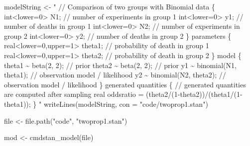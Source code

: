 \documentclass[
]{memoir}
\newenvironment{Shaded}{\begin{snugshade}}{\end{snugshade}}
\newcommand{\AttributeTok}[1]{\textcolor[rgb]{0.77,0.63,0.00}{#1}}
\newcommand{\DecValTok}[1]{\textcolor[rgb]{0.00,0.00,0.81}{#1}}
\newcommand{\FunctionTok}[1]{\textcolor[rgb]{0.00,0.00,0.00}{#1}}
\newcommand{\NormalTok}[1]{#1}
\newcommand{\OtherTok}[1]{\textcolor[rgb]{0.56,0.35,0.01}{#1}}
\newcommand{\SpecialCharTok}[1]{\textcolor[rgb]{0.00,0.00,0.00}{#1}}
\newcommand{\StringTok}[1]{\textcolor[rgb]{0.31,0.60,0.02}{#1}}
\begin{document}
\begin{Shaded}
\begin{Highlighting}[]
\NormalTok{modelString }\OtherTok{\textless{}{-}} \StringTok{"}
\StringTok{//  Comparison of two groups with Binomial}
\StringTok{data \{}
\StringTok{  int\textless{}lower=0\textgreater{} N1;              // number of experiments in group 1}
\StringTok{  int\textless{}lower=0\textgreater{} y1;              // number of deaths in group 1}
\StringTok{  int\textless{}lower=0\textgreater{} N2;              // number of experiments in group 2}
\StringTok{  int\textless{}lower=0\textgreater{} y2;              // number of deaths in group 2}
\StringTok{\}}
\StringTok{parameters \{}
\StringTok{  real\textless{}lower=0,upper=1\textgreater{} theta1; // probability of death in group 1}
\StringTok{  real\textless{}lower=0,upper=1\textgreater{} theta2; // probability of death in group 2}
\StringTok{\}}
\StringTok{model \{}
\StringTok{  theta1 \textasciitilde{} beta(2, 2);          // prior}
\StringTok{  theta2 \textasciitilde{} beta(2, 2);          // prior}
\StringTok{  y1 \textasciitilde{} binomial(N1, theta1);    // observation model / likelihood}
\StringTok{  y2 \textasciitilde{} binomial(N2, theta2);    // observation model / likelihood}
\StringTok{\}}
\StringTok{generated quantities \{}
\StringTok{  // generated quantities are computed after sampling}
\StringTok{  real oddsratio = (theta2/(1{-}theta2))/(theta1/(1{-}theta1));}
\StringTok{\}}
\StringTok{"}
\FunctionTok{writeLines}\NormalTok{(modelString, }\AttributeTok{con =} \StringTok{"code/twoprop1.stan"}\NormalTok{)}
\end{Highlighting}
\end{Shaded}

\begin{Shaded}
\begin{Highlighting}[]
\NormalTok{file }\OtherTok{\textless{}{-}} \FunctionTok{file.path}\NormalTok{(}\StringTok{"code"}\NormalTok{, }\StringTok{"twoprop1.stan"}\NormalTok{)}
\end{Highlighting}
\end{Shaded}

\begin{Shaded}
\begin{Highlighting}[]
\NormalTok{mod }\OtherTok{\textless{}{-}} \FunctionTok{cmdstan\_model}\NormalTok{(file)}
\end{Highlighting}
\end{Shaded}

\begin{Shaded}
\end{Shaded}
\end{document}

